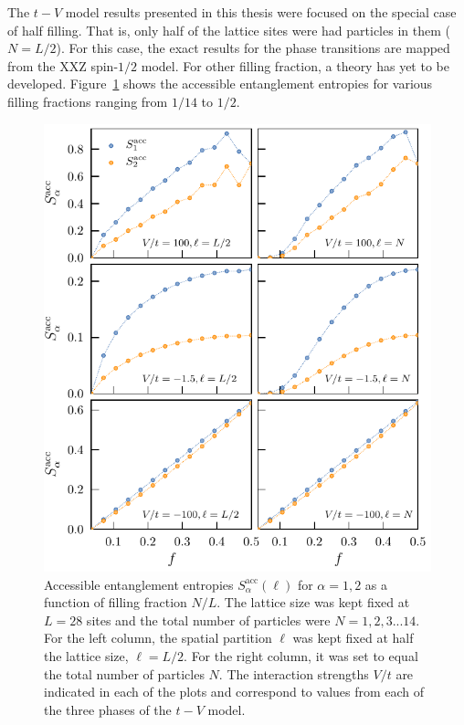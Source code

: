 	The $t-V$ model results presented in this thesis were focused on the special case of half filling. That is, only half of the lattice sites were had particles in them ($N = L/2$). For this case, the exact results for the phase transitions are mapped from the XXZ spin-$1/2$ model. For other filling fraction, a theory has yet to be developed. Figure~{\ref{fig:fillingFractionDependence}} shows the accessible entanglement entropies for various filling fractions ranging from $1/14$ to $1/2$. 
	
	\begin{figure}[htp]
	\begin{center}
	\includegraphics[width=1.0\columnwidth]{fillingFractionDependence.pdf}
	\end{center}
	\caption{Accessible entanglement entropies $S_{\alpha}^{\mathrm{acc}}(\ell)$ for $		\alpha = 1,2$ as a function of filling fraction $N/L$. The lattice size was kept fixed at 		$L=28$ sites and the total number of particles were $N=1,2,3...14$. For the left column, 	the spatial partition $\ell$ was kept fixed at half the lattice size, $\ell = L/2$. For the right 	column, it was set to equal the total number of particles $N$. The interaction strengths 	$V/t$ are indicated in each of the plots and correspond to values from each of the three 	phases of the $t-V$ model.}
	\label{fig:fillingFractionDependence}
	\end{figure}
	

